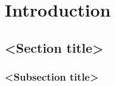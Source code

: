 \chapter{Introduction}
\lipsum[5]\cite{Alling2012} %
\section{<Section title>}
\lipsum[6-10]\cite{Tholander2013,Tholander2014} %
\subsection{<Subsection title>}
\lipsum[11-13]